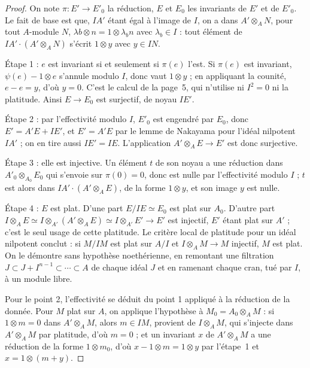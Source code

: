 \begin{proof}
On note $\pi : E' \to E'_0$ la réduction, $E$ et $E_0$ les invariants de $E'$ et de $E'_0$. Le fait de base est que, $IA'$ étant égal à l'image de $I$, on a dans $A' \otimes_A N$, pour tout $A$-module $N$, $\lambda b \otimes n = 1 \otimes \lambda_b n$ avec $\lambda_b \in I$ : tout élément de $IA' \cdot (A' \otimes_A N)$ s'écrit $1 \otimes y$ avec $y \in IN$.

Étape 1 : $e$ est invariant si et seulement si $\pi(e)$ l'est. Si $\pi(e)$ est invariant, $\psi(e) - 1 \otimes e$ s'annule modulo $I$, donc vaut $1 \otimes y$ ; en appliquant la counité, $e - e = y$, d'où $y = 0$. C'est le calcul de la page~5, qui n'utilise ni $I^2 = 0$ ni la platitude. Ainsi $E \to E_0$ est surjectif, de noyau $IE'$.

Étape 2 : par l'effectivité modulo $I$, $E'_0$ est engendré par $E_0$, donc $E' = A' E + IE'$, et $E' = A'E$ par le lemme de Nakayama pour l'idéal nilpotent $IA'$ ; on en tire aussi $IE' = IE$. L'application $A' \otimes_A E \to E'$ est donc surjective.

Étape 3 : elle est injective. Un élément $t$ de son noyau a une réduction dans $A'_0 \otimes_{A_0} E_0$ qui s'envoie sur $\pi(0) = 0$, donc est nulle par l'effectivité modulo $I$ ; $t$ est alors dans $IA' \cdot (A' \otimes_A E)$, de la forme $1 \otimes y$, et son image $y$ est nulle.

Étape 4 : $E$ est plat. D'une part $E/IE \simeq E_0$ est plat sur $A_0$. D'autre part $I \otimes_A E \simeq I \otimes_{A'} (A' \otimes_A E) \simeq I \otimes_{A'} E' \to E'$ est injectif, $E'$ étant plat sur $A'$ ; c'est le seul usage de cette platitude. Le critère local de platitude pour un idéal nilpotent conclut : si $M/IM$ est plat sur $A/I$ et $I \otimes_A M \to M$ injectif, $M$ est plat. On le démontre sans hypothèse noethérienne, en remontant une filtration $J \subset J + I^{n-1} \subset \cdots \subset A$ de chaque idéal $J$ et en ramenant chaque cran, tué par $I$, à un module libre.

Pour le point 2, l'effectivité se déduit du point 1 appliqué à la réduction de la donnée. Pour $M$ plat sur $A$, on applique l'hypothèse à $M_0 = A_0 \otimes_A M$ : si $1 \otimes m = 0$ dans $A' \otimes_A M$, alors $m \in IM$, provient de $I \otimes_A M$, qui s'injecte dans $A' \otimes_A M$ par platitude, d'où $m = 0$ ; et un invariant $x$ de $A' \otimes_A M$ a une réduction de la forme $1 \otimes m_0$, d'où $x - 1 \otimes m = 1 \otimes y$ par l'étape~1 et $x = 1 \otimes (m + y)$.
\end{proof}

